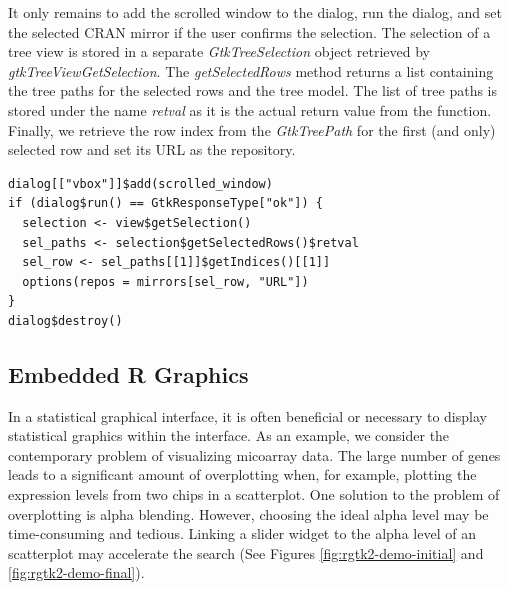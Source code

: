 \documentclass[article]{jss}
\begin{document}
It only remains to add the scrolled window to the dialog, run the
dialog, and set the selected CRAN mirror if the user confirms the
selection. The selection of a tree view is stored in a separate
\emph{GtkTreeSelection} object retrieved by
\emph{gtkTreeViewGetSelection}. The \emph{getSelectedRows} method
returns a list containing the tree paths for the selected rows and the
tree model. The list of tree paths is stored under the name
\emph{retval} as it is the actual return value from the 
function. Finally, we retrieve the row index from the
\emph{GtkTreePath} for the first (and only) selected row and set its
URL as the repository.
%
\begin{verbatim}
dialog[["vbox"]]$add(scrolled_window)
if (dialog$run() == GtkResponseType["ok"]) {
  selection <- view$getSelection()
  sel_paths <- selection$getSelectedRows()$retval
  sel_row <- sel_paths[[1]]$getIndices()[[1]]
  options(repos = mirrors[sel_row, "URL"])
}
dialog$destroy()
\end{verbatim}


\subsection{Embedded R Graphics}\label{sec:embedded-graphics}

In a statistical graphical interface, it is often beneficial or
necessary to display statistical graphics within the interface. As
an example, we consider the contemporary problem of visualizing
micoarray data. The large number of genes leads to a significant
amount of overplotting when, for example, plotting the expression
levels from two chips in a scatterplot. One solution to the problem of
overplotting is alpha blending. However, choosing the ideal alpha
level may be time-consuming and tedious. Linking a slider widget to
the alpha level of an  scatterplot may accelerate the
search (See Figures \ref{fig:rgtk2-demo-initial} and
\ref{fig:rgtk2-demo-final}).



\end{document}
